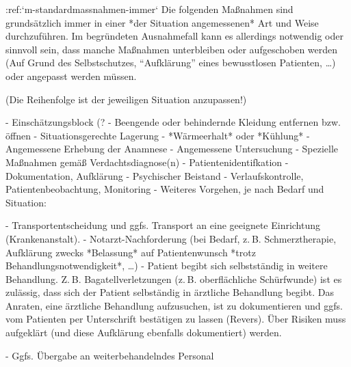 :ref:`m-standardmassnahmen-immer`\label{topic:standardmassnahmen-immer}%
Die folgenden Maßnahmen sind grundsätzlich immer in einer *der Situation
angemessenen* Art und Weise durchzuführen. Im begründeten Ausnahmefall kann es
allerdings notwendig oder sinnvoll sein, dass manche Maßnahmen unterbleiben oder
aufgeschoben werden (Auf Grund des Selbstschutzes, \enquote{Aufklärung} eines bewusstlosen Patienten,
\ldots{}) oder angepasst werden müssen.

{\scriptsize (Die Reihenfolge ist der jeweiligen Situation anzupassen!)}
\begin{itemize}
  -   Einschätzungsblock (?
  -   Beengende oder behindernde Kleidung entfernen bzw.
  öffnen
  -   Situationsgerechte Lagerung
  -   *Wärmeerhalt* oder *Kühlung*
  -   Angemessene Erhebung der Anamnese 
  -   Angemessene Untersuchung 
  -   Spezielle Maßnahmen gemäß Verdachtsdiagnose(n)
  -   Patientenidentifkation
  -   Dokumentation, Aufklärung
  -   Psychischer Beistand
  -   Verlaufskontrolle, Patientenbeobachtung, Monitoring
  -   Weiteres Vorgehen, je nach Bedarf und Situation:
  
  
 
  \begin{itemize}\label{tab:pam-weiterfuehrende}
    -   Transportentscheidung und ggfs. Transport an eine
    geeignete Einrichtung (Krankenanstalt).
    -   Notarzt-Nachforderung (bei Bedarf, z. B. Schmerztherapie,
    Aufklärung zwecks *Belassung* auf
    Patientenwunsch *trotz Behandlungsnotwendigkeit*, \ldots)
    -   Patient begibt sich selbstständig in weitere
    Behandlung. Z. B. Bagatellverletzungen (z. B.
    oberflächliche Schürfwunde) ist es zulässig, dass sich
    der Patient selbständig in ärztliche Behandlung begibt.
    Das Anraten, eine ärztliche Behandlung aufzusuchen, ist
    zu dokumentieren und ggfs. vom Patienten per
    Unterschrift bestätigen zu lassen (Revers). Über Risiken
    muss aufgeklärt (und diese Aufklärung ebenfalls
    dokumentiert) werden.
  \end{itemize}
  -   Ggfs. Übergabe an weiterbehandelndes Personal
\end{itemize}

